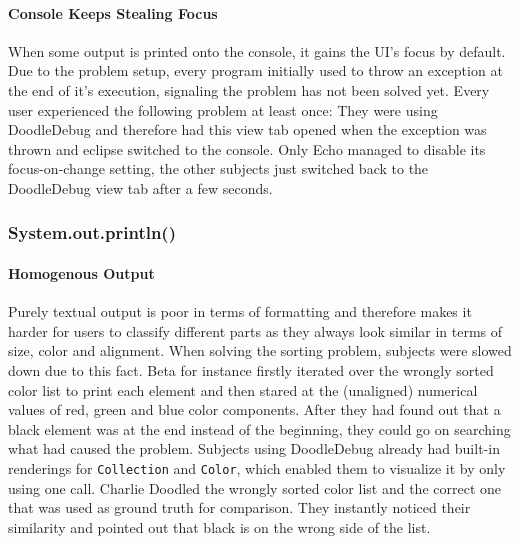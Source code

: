 \documentclass[english]{acm_proc_article-sp}
\begin{document}
\paragraph{Console Keeps Stealing Focus}
\label{console-focus-problem}
When some output is printed onto the console, it gains the UI's focus by default. 
Due to the problem setup, every program initially used to throw an exception at the end of it's execution, signaling the problem has not been solved yet. 
Every user experienced the following problem at least once: They were using DoodleDebug and therefore had this view tab opened when the exception was thrown and eclipse switched to the console. 
Only Echo managed to disable its focus-on-change setting, the other subjects just switched back to the DoodleDebug view tab after a few seconds.

\subsubsection{System.out.println()}
\paragraph{Homogenous Output}
Purely textual output is poor in terms of formatting and therefore makes it harder for users to classify different parts as they always look similar in terms of size, color and alignment. 
When solving the sorting problem, subjects were slowed down due to this fact. 
Beta for instance firstly iterated over the wrongly sorted color list to print each element and then stared at the (unaligned) numerical values of red, green and blue color components. 
After they had found out that a black element was at the end instead of the beginning, they could go on searching what had caused the problem. 
Subjects using DoodleDebug already had built-in renderings for \verb.Collection. 
and \verb.Color., which enabled them to visualize it by only using one call. 
Charlie Doodled the wrongly sorted color list and the correct one that was used as ground truth for comparison. 
They instantly noticed their similarity and pointed out that black is on the wrong side of the list.
\end{document}
